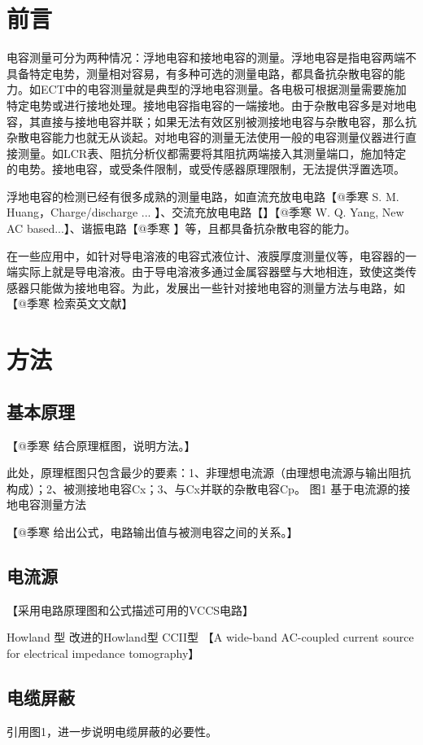\section{前言}

电容测量可分为两种情况：浮地电容和接地电容的测量。浮地电容是指电容两端不具备特定电势，测量相对容易，有多种可选的测量电路，都具备抗杂散电容的能力。如ECT中的电容测量就是典型的浮地电容测量。各电极可根据测量需要施加特定电势或进行接地处理。接地电容指电容的一端接地。由于杂散电容多是对地电容，其直接与接地电容并联；如果无法有效区别被测接地电容与杂散电容，那么抗杂散电容能力也就无从谈起。对地电容的测量无法使用一般的电容测量仪器进行直接测量。如LCR表、阻抗分析仪都需要将其阻抗两端接入其测量端口，施加特定的电势。接地电容，或受条件限制，或受传感器原理限制，无法提供浮置选项。

浮地电容的检测已经有很多成熟的测量电路，如直流充放电电路【﻿﻿@季寒﻿﻿ S. M. Huang，Charge/discharge ... 】、交流充放电电路【】【﻿﻿@季寒﻿﻿ W. Q. Yang, New AC based...】、谐振电路【﻿﻿@季寒﻿﻿ 】等，且都具备抗杂散电容的能力。

在一些应用中，如针对导电溶液的电容式液位计、液膜厚度测量仪等，电容器的一端实际上就是导电溶液。由于导电溶液多通过金属容器壁与大地相连，致使这类传感器只能做为接地电容。为此，发展出一些针对接地电容的测量方法与电路，如【﻿﻿@季寒﻿﻿ 检索英文文献】

\section{方法}
\subsection{基本原理}

【﻿﻿@季寒﻿﻿ 结合原理框图，说明方法。】

此处，原理框图只包含最少的要素：1、非理想电流源（由理想电流源与输出阻抗构成）；2、被测接地电容Cx；3、与Cx并联的杂散电容Cp。
图1 基于电流源的接地电容测量方法

【﻿﻿@季寒﻿﻿ 给出公式，电路输出值与被测电容之间的关系。】


\subsection{电流源}
【采用电路原理图和公式描述可用的VCCS电路】

Howland 型
改进的Howland型
CCII型
【A wide-band AC-coupled current source for electrical impedance tomography】

\subsection{电缆屏蔽}
引用图1，进一步说明电缆屏蔽的必要性。


